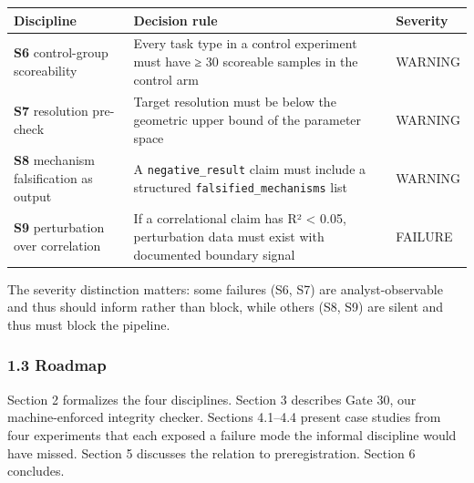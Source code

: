\documentclass[
]{article}
\newcounter{none} %
\begin{document}
{\def\LTcaptype{none} %
\begin{longtable}[]{@{}
  >{\raggedright\arraybackslash}p{}
  >{\raggedright\arraybackslash}p{}
  >{\raggedright\arraybackslash}p{}@{}}
\toprule\noalign{}
\begin{minipage}[b]{\linewidth}\raggedright
Discipline
\end{minipage} & \begin{minipage}[b]{\linewidth}\raggedright
Decision rule
\end{minipage} & \begin{minipage}[b]{\linewidth}\raggedright
Severity
\end{minipage} \\
\midrule\noalign{}
\endhead
\bottomrule\noalign{}
\endlastfoot
\textbf{S6} control-group scoreability & Every task type in a control
experiment must have ≥ 30 scoreable samples in the control arm &
WARNING \\
\textbf{S7} resolution pre-check & Target resolution must be below the
geometric upper bound of the parameter space & WARNING \\
\textbf{S8} mechanism falsification as output & A
\texttt{negative\_result} claim must include a structured
\texttt{falsified\_mechanisms} list & WARNING \\
\textbf{S9} perturbation over correlation & If a correlational claim has
R² \textless{} 0.05, perturbation data must exist with documented
boundary signal & FAILURE \\
\end{longtable}
}

The severity distinction matters: some failures (S6, S7) are
analyst-observable and thus should inform rather than block, while
others (S8, S9) are silent and thus must block the pipeline.

\subsubsection{1.3 Roadmap}\label{roadmap}

Section 2 formalizes the four disciplines. Section 3 describes Gate 30,
our machine-enforced integrity checker. Sections 4.1--4.4 present case
studies from four experiments that each exposed a failure mode the
informal discipline would have missed. Section 5 discusses the relation
to preregistration. Section 6 concludes.
\end{document}
